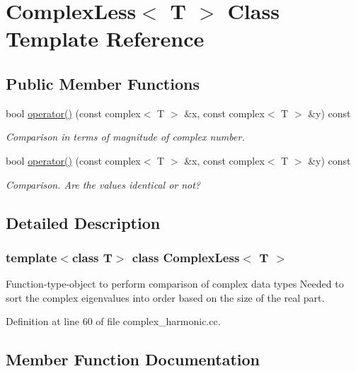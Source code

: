 \hypertarget{classComplexLess}{}\section{Complex\+Less$<$ T $>$ Class Template Reference}
\label{classComplexLess}
\subsection*{Public Member Functions}
\begin{DoxyCompactItemize}
\item 
bool \hyperlink{classComplexLess_abb81bdb8dd1f9076863b5f3523272343}{operator()} (const complex$<$ T $>$ \&x, const complex$<$ T $>$ \&y) const
\begin{DoxyCompactList}\small\item\em Comparison in terms of magnitude of complex number. \end{DoxyCompactList}\item 
bool \hyperlink{classComplexLess_abb81bdb8dd1f9076863b5f3523272343}{operator()} (const complex$<$ T $>$ \&x, const complex$<$ T $>$ \&y) const
\begin{DoxyCompactList}\small\item\em Comparison. Are the values identical or not? \end{DoxyCompactList}\end{DoxyCompactItemize}


\subsection{Detailed Description}
\subsubsection*{template$<$class T$>$\newline
class Complex\+Less$<$ T $>$}

Function-\/type-\/object to perform comparison of complex data types Needed to sort the complex eigenvalues into order based on the size of the real part. 

Definition at line 60 of file complex\+\_\+harmonic.\+cc.



\subsection{Member Function Documentation}
\mbox{\label{classComplexLess_abb81bdb8dd1f9076863b5f3523272343}} 

